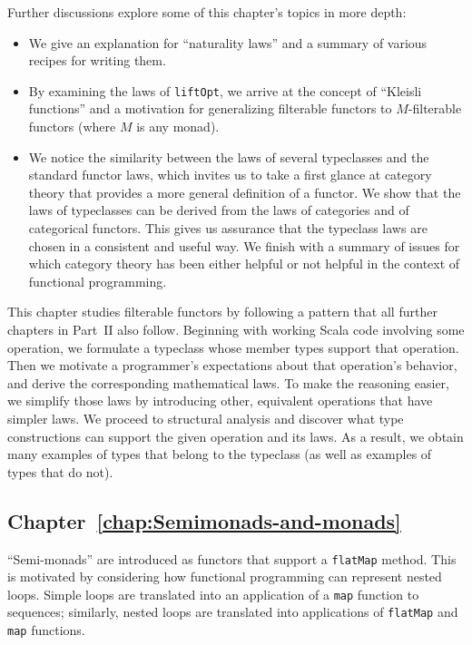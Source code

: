 Further discussions explore some of this chapter\textsf{'}s topics in more
depth:
\begin{itemize}
\item We give an explanation for \textsf{``}naturality laws\textsf{''} and a summary of
various recipes for writing them.
\item By examining the laws of \lstinline!liftOpt!, we arrive at the concept
of \textsf{``}Kleisli functions\textsf{''} and a motivation for generalizing filterable
functors to $M$-filterable functors (where $M$ is any monad). 
\item We notice the similarity between the laws of several typeclasses and
the standard functor laws, which invites us to take a first glance
at category theory that provides a more general definition of a functor.
We show that the laws of typeclasses can be derived from the laws
of categories and of categorical functors. This gives us assurance
that the typeclass laws are chosen in a consistent and useful way.
We finish with a summary of issues for which category theory has been
either helpful or not helpful in the context of functional programming.
\end{itemize}
This chapter studies filterable functors by following a pattern that
all further chapters in Part~II also follow. Beginning with working
Scala code involving some operation, we formulate a typeclass whose
member types support that operation. Then we motivate a programmer\textsf{'}s
expectations about that operation\textsf{'}s behavior, and derive the corresponding
mathematical laws. To make the reasoning easier, we simplify those
laws by introducing other, equivalent operations that have simpler
laws. We proceed to structural analysis and discover what type constructions
can support the given operation and its laws. As a result, we obtain
many examples of types that belong to the typeclass (as well as examples
of types that do not).

\subsection{Chapter~\ref{chap:Semimonads-and-monads}}

\textsf{``}Semi-monads\textsf{''} are introduced as functors that support a \lstinline!flatMap!
method. This is motivated by considering how functional programming
can represent nested loops. Simple loops are translated into an application
of a \lstinline!map! function to sequences; similarly, nested loops
are translated into applications of \lstinline!flatMap! and \lstinline!map!
functions. 

